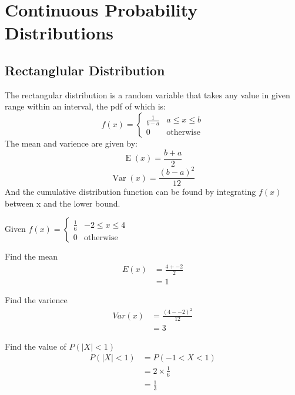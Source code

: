 
\section{Continuous Probability Distributions}


    \subsection{Rectanglular Distribution}
        The rectangular distribution is a random variable that takes any value in given range within an interval, the pdf of which is:
        $$
        f(x) = 
        \begin{cases}
        \frac{1}{b - a} & a \leq x \leq b\\
        0 & \text{otherwise}
        \end{cases}
        $$
        The mean and varience are given by:
        $$\operatorname{E}(x) = \frac{b + a}{2}$$
        $$\operatorname{Var}(x) = \frac{(b - a)^2}{12}$$
        And the cumulative distribution function can be found by integrating $f(x)$ between x and the lower bound.

        \begin{example}
        {
            Given $
            f(x) = 
            \begin{cases}
                \frac{1}{6} & -2 \leq x \leq 4\\
                0 & \text{otherwise}
            \end{cases}
            $
        }

        \begin{step}{Find the mean}
        \begin{align*}
        E(x) &= \frac{4 + -2}{2} \\
             &= 1
        \end{align*}
        \end{step}

        \begin{step}{Find the varience}
        \begin{align*}
        Var(x) &= \frac{(4 - -2)^2}{12} \\
               &= 3
        \end{align*}
        \end{step}

        \begin{step}{Find the value of $P(|X| < 1)$}
        \begin{align*}
        P(|X| < 1) &= P(-1 < X < 1) \\
                   &= 2 \times \frac{1}{6} \\
                   &= \frac{1}{3}
        \end{align*}
        \end{step}

        \end{example}



